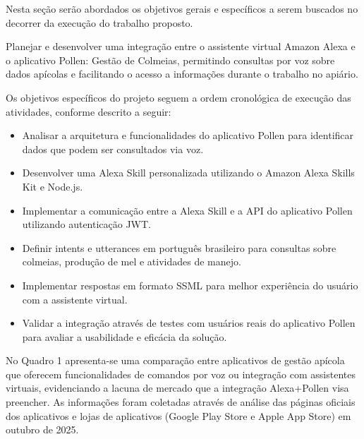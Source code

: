 \label{sec:objetivos}
Nesta seção serão abordados os objetivos gerais e específicos a serem buscados no decorrer da execução do trabalho proposto.

\label{ssec:objetivo-geral}

Planejar e desenvolver uma integração entre o assistente virtual Amazon Alexa e o aplicativo Pollen: Gestão de Colmeias, permitindo consultas por voz sobre dados apícolas e facilitando o acesso a informações durante o trabalho no apiário.

\label{ssec:objetivos-especificos}

Os objetivos específicos do projeto seguem a ordem cronológica de execução das atividades, conforme descrito a seguir:

\begin{itemize}
    \item Analisar a arquitetura e funcionalidades do aplicativo Pollen para identificar dados que podem ser consultados via voz.
    
    \item Desenvolver uma Alexa Skill personalizada utilizando o Amazon Alexa Skills Kit e Node.js.

    \item Implementar a comunicação entre a Alexa Skill e a API do aplicativo Pollen utilizando autenticação JWT.

    \item Definir intents e utterances em português brasileiro para consultas sobre colmeias, produção de mel e atividades de manejo.

    \item Implementar respostas em formato SSML para melhor experiência do usuário com a assistente virtual.

    \item Validar a integração através de testes com usuários reais do aplicativo Pollen para avaliar a usabilidade e eficácia da solução.
\end{itemize}

No Quadro 1 apresenta-se uma comparação entre aplicativos de gestão apícola que oferecem funcionalidades de comandos por voz ou integração com assistentes virtuais, evidenciando a lacuna de mercado que a integração Alexa+Pollen visa preencher. As informações foram coletadas através de análise das páginas oficiais dos aplicativos e lojas de aplicativos (Google Play Store e Apple App Store) em outubro de 2025.

